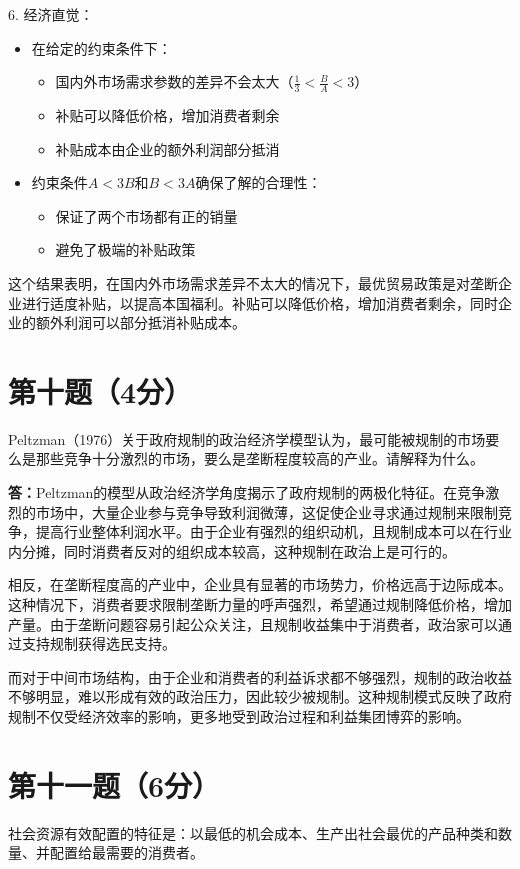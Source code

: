 \documentclass[12pt]{article}
\begin{document}
6. 经济直觉：
\begin{itemize}
\item 在给定的约束条件下：
    \begin{itemize}
    \item 国内外市场需求参数的差异不会太大（$\frac{1}{3}<\frac{B}{A}<3$）
    \item 补贴可以降低价格，增加消费者剩余
    \item 补贴成本由企业的额外利润部分抵消
    \end{itemize}
\item 约束条件$A<3B$和$B<3A$确保了解的合理性：
    \begin{itemize}
    \item 保证了两个市场都有正的销量
    \item 避免了极端的补贴政策
    \end{itemize}
\end{itemize}

这个结果表明，在国内外市场需求差异不太大的情况下，最优贸易政策是对垄断企业进行适度补贴，以提高本国福利。补贴可以降低价格，增加消费者剩余，同时企业的额外利润可以部分抵消补贴成本。

\section*{第十题（4分）}
Peltzman（1976）关于政府规制的政治经济学模型认为，最可能被规制的市场要么是那些竞争十分激烈的市场，要么是垄断程度较高的产业。请解释为什么。

\noindent\textbf{答：}Peltzman的模型从政治经济学角度揭示了政府规制的两极化特征。在竞争激烈的市场中，大量企业参与竞争导致利润微薄，这促使企业寻求通过规制来限制竞争，提高行业整体利润水平。由于企业有强烈的组织动机，且规制成本可以在行业内分摊，同时消费者反对的组织成本较高，这种规制在政治上是可行的。

相反，在垄断程度高的产业中，企业具有显著的市场势力，价格远高于边际成本。这种情况下，消费者要求限制垄断力量的呼声强烈，希望通过规制降低价格，增加产量。由于垄断问题容易引起公众关注，且规制收益集中于消费者，政治家可以通过支持规制获得选民支持。

而对于中间市场结构，由于企业和消费者的利益诉求都不够强烈，规制的政治收益不够明显，难以形成有效的政治压力，因此较少被规制。这种规制模式反映了政府规制不仅受经济效率的影响，更多地受到政治过程和利益集团博弈的影响。

\section*{第十一题（6分）}
社会资源有效配置的特征是：以最低的机会成本、生产出社会最优的产品种类和数量、并配置给最需要的消费者。
\end{document}
